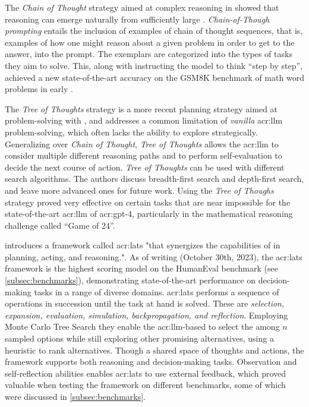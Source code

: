 The \textit{Chain of Thought} strategy \citep{weiChainofThoughtPromptingElicits2023} aimed at complex reasoning in  showed that reasoning can emerge naturally from sufficiently large .  \textit{Chain-of-Though prompting} entails the inclusion of examples of chain of thought sequences, that is, examples of how one might reason about a given problem in order to get to the answer, into the prompt. The exemplars are categorized into the types of tasks they aim to solve. This, along with instructing the model to think \enquote{step by step}, achieved a new state-of-the-art accuracy on the GSM8K benchmark of math word problems in early \citeyear{weiChainofThoughtPromptingElicits2023}.

The \textit{Tree of Thoughts} strategy \citep{yaoTreeThoughtsDeliberate2023} is a more recent planning strategy aimed at problem-solving with , and addresses a common limitation of \textit{vanilla} \acrshort{acr:llm} problem-solving, which often lacks the ability to explore strategically. Generalizing over \textit{Chain of Thought}, \textit{Tree of Thoughts} allows the \acrshort{acr:llm} to consider multiple different reasoning paths and to perform self-evaluation to decide the next course of action. \textit{Tree of Thoughts} can be used with different search algorithms. The authors discuss breadth-first search and depth-first search, and leave more advanced ones for future work. Using the \textit{Tree  of Thoughs} strategy proved very effective on certain tasks that are near impossible for the state-of-the-art \acrshort{acr:llm} of \acrshort{acr:gpt}-4, particularly in the mathematical reasoning challenge called \enquote{Game of 24}.

\cite{zhouLanguageAgentTree2023} introduces a framework called \gls{acr:lats} "that synergizes the capabilities of  in planning, acting, and reasoning.". As of writing (October 30th, 2023), the \gls{acr:lats} framework is the highest scoring model on the HumanEval benchmark (see \autoref{subsec:benchmarks}), demonstrating state-of-the-art performance on decision-making tasks in a range of diverse domains. \gls{acr:lats} performs a sequence of operations in succession until the task at hand is solved. These are \textit{selection, expansion, evaluation, simulation, backpropagation, and reflection}. Employing Monte Carlo Tree Search they enable the \acrshort{acr:llm}-based to select the among $n$ sampled options while still exploring other promising alternatives, using a heuristic to rank alternatives. Though a shared space of thoughts and actions, the framework supports both reasoning and decision-making tasks. Observation and self-reflection abilities enables \acrshort{acr:lats} to use external feedback, which proved valuable when testing the framework on different benchmarks, some of which were discussed in \autoref{subsec:benchmarks}.



